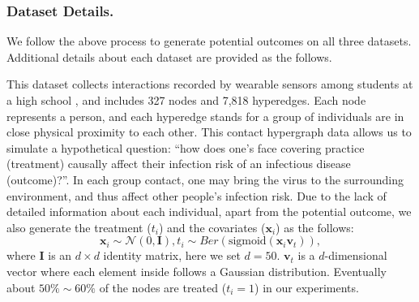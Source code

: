 \subsubsection{Dataset Details.} We follow the above process to generate potential outcomes on all three datasets. Additional details about each dataset are provided as the follows.

 This dataset collects interactions recorded by wearable sensors among students at a high school \cite{mastrandrea2015contact,benson2018simplicial}, and includes 327 nodes and 7,818 hyperedges. 
Each node represents a person, and each hyperedge stands for a group of individuals are in close physical proximity to each other. This contact hypergraph data allows us to simulate a hypothetical question: ``how does one's face covering practice (treatment) causally affect their infection risk of an infectious disease (outcome)?''.
In each group contact, one may bring the virus to the surrounding environment, and thus affect other people's infection risk. Due to the lack of detailed information about each individual, apart from the potential outcome, we also generate the treatment ($t_i$) and the covariates ($\mathbf{x}_i$) as the follows:
\begin{equation}
    \mathbf{x}_i \sim \mathcal{N}(0,\mathbf{I}), {t}_{i} \sim Ber(\text{sigmoid}(\mathbf{x}_i\mathbf{v}_t)),
\end{equation}
where $\mathbf{I}$ is an $d\times d$ identity matrix, here we set $d=50$. $\mathbf{v}_t$ is a $d$-dimensional vector where each element inside follows a  Gaussian distribution. Eventually about $50\%\sim 60\%$ of the nodes are treated (${t}_{i}=1$) in our experiments.



